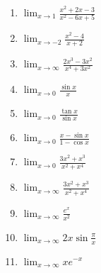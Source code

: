 \documentclass[../main.tex]{subfiles}
\begin{document}
\begin{enumerate}[itemsep=0.7cm]
    \item 
    $\displaystyle \lim_{x\rightarrow 1}\frac{x^2+2x-3}{x^2-6x+5}$

    \item 
    $\displaystyle \lim_{x\rightarrow -2}\frac{x^2-4}{x+2}$

    \item 
    $\displaystyle \lim_{x\rightarrow \infty}\frac{2x^3-3x^2}{x^4+3x^2}$

    \item 
    $\displaystyle \lim_{x\rightarrow 0}\frac{\sin{x}}{x}$

    \item 
    $\displaystyle \lim_{x\rightarrow 0}\frac{\tan{x}}{\sin{x}}$

    \item 
    $\displaystyle \lim_{x\rightarrow 0}\frac{x-\sin{x}}{1-\cos{x}}$

    \item 
    $\displaystyle \lim_{x\rightarrow 0}\frac{3x^2+x^3}{x^2+x^4}$

    \item 
    $\displaystyle \lim_{x\rightarrow \infty}\frac{3x^2+x^3}{x^2+x^4}$

    \item 
    $\displaystyle \lim_{x\rightarrow \infty}\frac{e^x}{x^2}$

    \item 
    $\displaystyle \lim_{x\rightarrow \infty}2x\sin{\frac{\pi}{x}}$

    \item 
    $\displaystyle \lim_{x\rightarrow \infty}x e^{-x}$

\end{enumerate}
\end{document}
